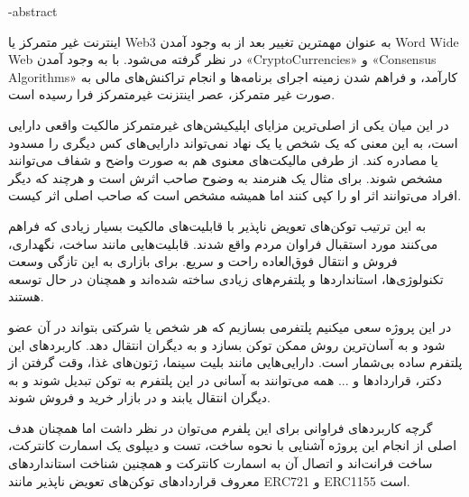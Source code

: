 



\fa-abstract{ %
اینترنت غیر متمرکز یا 
Web3
 به عنوان مهمترین تغییر بعد از به وجود آمدن
\gls{Word Wide Web}
 در نظر گرفته می‌شود. با به وجود آمدن
«\gls{CryptoCurrencies}»
و
«\gls{Consensus Algorithms}»
 کارآمد، و فراهم شدن زمینه اجرای برنامه‌ها و انجام تراکنش‌های مالی به صورت غیر متمرکز، عصر اینتزنت غیرمتمرکز فرا رسیده است.

در این میان یکی از اصلی‌ترین مزایای اپلیکیشن‌های غیرمتمرکز مالکیت واقعی دارایی است، به این معنی که یک شخص یا یک نهاد نمی‌تواند دارایی‌های کس دیگری را مسدود یا مصادره کند. از طرفی مالیکت‌های معنوی هم به صورت واضح و شفاف می‌توانند مشخص شوند. برای مثال یک هنرمند به وضوح صاحب اثرش است و هرچند که دیگر افراد می‌توانند اثر او را کپی کنند اما همیشه مشخص است که صاحب اصلی اثر کیست.

به این ترتیب توکن‌های تعویض ناپذیر با قابلیت‌های مالکیت بسیار زیادی که فراهم می‌کنند مورد استقبال فراوان مردم واقع شدند. قابلیت‌هایی مانند ساخت، نگهداری، فروش و انتقال فوق‌العاده راحت و سریع. برای بازاری به این تازگی وسعت تکنولوژی‌ها، استاندارد‌ها و پلتفرم‌های زیادی ساخته شده‌اند و همچنان در حال توسعه هستند.

در این پروژه سعی میکنیم پلتفرمی بسازیم که هر شخص یا شرکتی بتواند در آن عضو شود و به آسان‌ترین روش ممکن توکن‌ بسازد و به دیگران انتقال دهد. کاربرد‌های این پلتفرم ساده بی‌شمار است. دارایی‌هایی مانند بلیت سینما، ژتون‌های غذا، وقت گرفتن از دکتر، قراردادها و ... همه می‌توانند به آسانی در این پلتفرم به توکن تبدیل شوند و به دیگران انتقال یابند و در بازار خرید و فروش شوند.

گرچه کاربردهای فراوانی برای این پلفرم می‌توان در نظر داشت اما همچنان هدف اصلی از انجام این پروژه آشنایی با نحوه ساخت، تست و دیپلوی یک اسمارت کانترکت، ساخت فرانت‌اند و اتصال آن به اسمارت کانترکت و همچنین شناخت استاندارد‌های معروف قرارداد‌های توکن‌های تعویض ناپذیر مانند ERC721 و ERC1155 است.
}
